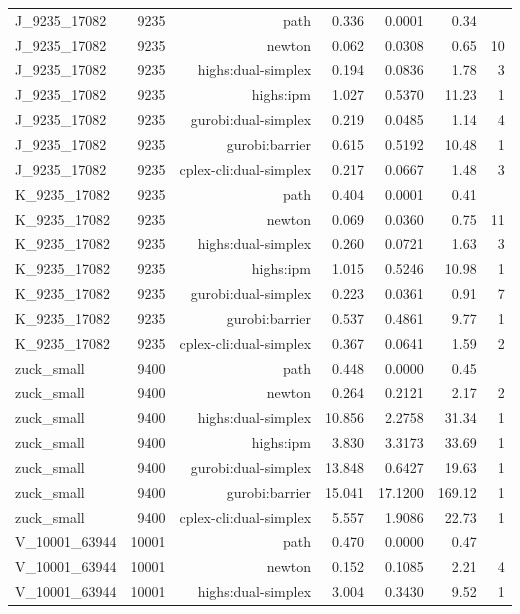 \begin{longtable}{lrrrrrr}
J\_9235\_17082 & 9235 & path & 0.336 & 0.0001 & 0.34 &  \\
J\_9235\_17082 & 9235 & newton & 0.062 & 0.0308 & 0.65 & 10 \\
J\_9235\_17082 & 9235 & highs:dual-simplex & 0.194 & 0.0836 & 1.78 & 3 \\
J\_9235\_17082 & 9235 & highs:ipm & 1.027 & 0.5370 & 11.23 & 1 \\
J\_9235\_17082 & 9235 & gurobi:dual-simplex & 0.219 & 0.0485 & 1.14 & 4 \\
J\_9235\_17082 & 9235 & gurobi:barrier & 0.615 & 0.5192 & 10.48 & 1 \\
J\_9235\_17082 & 9235 & cplex-cli:dual-simplex & 0.217 & 0.0667 & 1.48 & 3 \\
K\_9235\_17082 & 9235 & path & 0.404 & 0.0001 & 0.41 &  \\
K\_9235\_17082 & 9235 & newton & 0.069 & 0.0360 & 0.75 & 11 \\
K\_9235\_17082 & 9235 & highs:dual-simplex & 0.260 & 0.0721 & 1.63 & 3 \\
K\_9235\_17082 & 9235 & highs:ipm & 1.015 & 0.5246 & 10.98 & 1 \\
K\_9235\_17082 & 9235 & gurobi:dual-simplex & 0.223 & 0.0361 & 0.91 & 7 \\
K\_9235\_17082 & 9235 & gurobi:barrier & 0.537 & 0.4861 & 9.77 & 1 \\
K\_9235\_17082 & 9235 & cplex-cli:dual-simplex & 0.367 & 0.0641 & 1.59 & 2 \\
zuck\_small & 9400 & path & 0.448 & 0.0000 & 0.45 &  \\
zuck\_small & 9400 & newton & 0.264 & 0.2121 & 2.17 & 2 \\
zuck\_small & 9400 & highs:dual-simplex & 10.856 & 2.2758 & 31.34 & 1 \\
zuck\_small & 9400 & highs:ipm & 3.830 & 3.3173 & 33.69 & 1 \\
zuck\_small & 9400 & gurobi:dual-simplex & 13.848 & 0.6427 & 19.63 & 1 \\
zuck\_small & 9400 & gurobi:barrier & 15.041 & 17.1200 & 169.12 & 1 \\
zuck\_small & 9400 & cplex-cli:dual-simplex & 5.557 & 1.9086 & 22.73 & 1 \\
V\_10001\_63944 & 10001 & path & 0.470 & 0.0000 & 0.47 &  \\
V\_10001\_63944 & 10001 & newton & 0.152 & 0.1085 & 2.21 & 4 \\
V\_10001\_63944 & 10001 & highs:dual-simplex & 3.004 & 0.3430 & 9.52 & 1 \\

\end{longtable}
